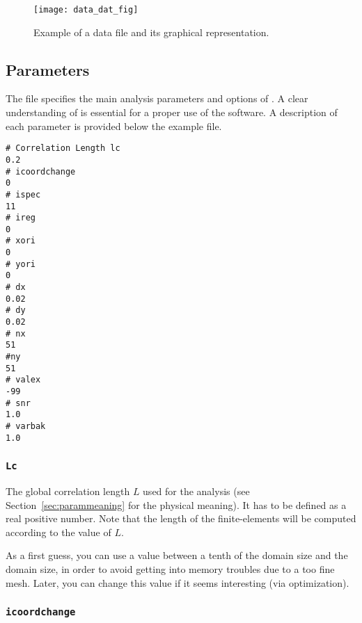 \begin{figure}[H]
\centering
\texttt{[image: data\_dat\_fig]}
\caption{Example of a data file and its graphical representation.}
\end{figure}




\subsection{Parameters\label{sec:param.par}}

The file  specifies the main analysis parameters and options of \diva. A clear understanding of is essential for a proper use of the software. A description of each parameter is provided below the example file.

\begin{exfile}[htpb]
\begin{verbatim}
# Correlation Length lc
0.2
# icoordchange
0
# ispec
11
# ireg
0
# xori
0
# yori
0
# dx
0.02
# dy
0.02
# nx
51
#ny
51
# valex
-99
# snr
1.0
# varbak
1.0
\end{verbatim}
\caption{param.par\label{paramfile}}
\end{exfile}


\subsubsection{\texttt{Lc}}

The global correlation length $L$  used for the analysis (see Section~\ref{sec:parammeaning} for 
the physical meaning). It has to be defined as a real positive number. Note that the length of the finite-elements 
will be computed according to the value of $L$.

As a first guess, you can use a value between a tenth of the domain size and the domain size, in order to avoid
getting into memory troubles due to a too fine mesh. Later, you can change this value if it seems interesting (via optimization).

\subsubsection{\texttt{icoordchange}\label{sec:icoord}}


